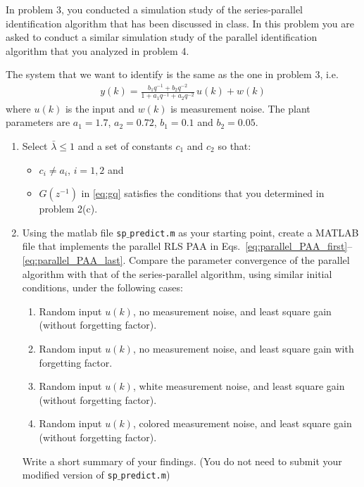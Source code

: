 \item
In problem 3, you conducted a simulation study of the series-parallel identification algorithm that has been discussed in class. In this problem you are asked to conduct a similar simulation study of the parallel identification algorithm that you analyzed in problem 4.

The system that we want to identify is the same as the one in problem 3, i.e.
\begin{align*}
    y(k) = \frac{b_1q^{-1} + b_2 q^{-2}}{1 + a_1 q^{-1} + a_2 q^{-2}}\, u(k) + w(k)
\end{align*}
where $u(k)$ is the input and $w(k)$ is measurement noise. The plant parameters are $a_1 = 1.7$, $a_2 = 0.72$, $b_1 =0.1$ and $b_2=0.05$.

\begin{enumerate}
    \item
    Select $\bar{\lambda} \leq 1$ and a set of constants $c_1$ and $c_2$ so that:
    \begin{itemize}
        \item $c_i \neq a_i$, $i=1,2$ and
        \item $G(z^{-1})$ in \eqref{eq:gq} satisfies the conditions that you determined in problem 2(c).
    \end{itemize}

    \item
    Using the matlab file {\tt sp$\_$predict.m} as your starting point, create a MATLAB file
    that implements the parallel RLS PAA in Eqs.~\eqref{eq:parallel_PAA_first}--\eqref{eq:parallel_PAA_last}. Compare the parameter convergence of the parallel algorithm with that of the series-parallel algorithm, using similar initial conditions, under the following cases:
    \begin{enumerate}
        \item
        Random input $u(k)$, no measurement noise, and least square gain (without forgetting factor).

        \item
        Random input $u(k)$, no measurement noise, and least square gain with forgetting factor.
        \item
        Random input $u(k)$, white measurement noise, and least square gain (without forgetting factor).

        \item
        Random input $u(k)$, colored measurement noise, and least square gain (without forgetting factor).
    \end{enumerate}
    Write a short summary of your findings. (You do not need to submit your modified version of {\tt sp$\_$predict.m})

\end{enumerate}



